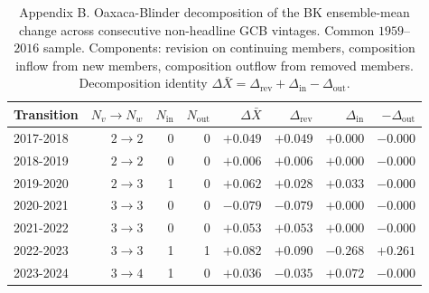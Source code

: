 \begin{table}[h]
  \centering
  \caption{Appendix B. Oaxaca-Blinder decomposition of the BK ensemble-mean change across consecutive non-headline GCB vintages. Common $1959$--$2016$ sample. Components: revision on continuing members, composition inflow from new members, composition outflow from removed members. Decomposition identity $\Delta \bar X = \Delta_{\mathrm{rev}} + \Delta_{\mathrm{in}} - \Delta_{\mathrm{out}}$.}
  \label{tab:appB_bk}
  \begin{tabular}{lrrrrrrr}
    \toprule
    Transition & $N_v\!\to\! N_w$ & $N_{\mathrm{in}}$ & $N_{\mathrm{out}}$ & $\Delta \bar X$ & $\Delta_{\mathrm{rev}}$ & $\Delta_{\mathrm{in}}$ & $-\Delta_{\mathrm{out}}$ \\
    \midrule
    2017-2018 & $2\!\to\!2$ & 0 & 0 & $+0.049$ & $+0.049$ & $+0.000$ & $-0.000$ \\
    2018-2019 & $2\!\to\!2$ & 0 & 0 & $+0.006$ & $+0.006$ & $+0.000$ & $-0.000$ \\
    2019-2020 & $2\!\to\!3$ & 1 & 0 & $+0.062$ & $+0.028$ & $+0.033$ & $-0.000$ \\
    2020-2021 & $3\!\to\!3$ & 0 & 0 & $-0.079$ & $-0.079$ & $+0.000$ & $-0.000$ \\
    2021-2022 & $3\!\to\!3$ & 0 & 0 & $+0.053$ & $+0.053$ & $+0.000$ & $-0.000$ \\
    2022-2023 & $3\!\to\!3$ & 1 & 1 & $+0.082$ & $+0.090$ & $-0.268$ & $+0.261$ \\
    2023-2024 & $3\!\to\!4$ & 1 & 0 & $+0.036$ & $-0.035$ & $+0.072$ & $-0.000$ \\
    \bottomrule
  \end{tabular}
\end{table}

